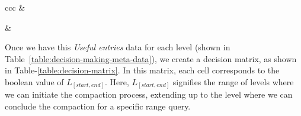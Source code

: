 \begin{table}
\begin{tabular}{ccc}
        &


        &

    \end{tabular}
    \caption{Examples highlighting scenarios where query-driven compaction is not performed, based on the decision 
    matrix. These instances provide insights into the conditions under which the system opts for the conventional 
    compaction approach.}\label{fig:not_performing_query-driven_compaction}
    \label{table:ex-not-performing-compaction}
\end{table}

Once we have this \textit{Useful entries} data for each level (shown in Table~\ref{table:decision-making-meta-data}), we create a decision matrix, as shown in Table-\ref{table:decision-matrix}. 
In this matrix, each cell corresponds to the boolean value of $L_{[start, end]}$. Here, $L_{[start, end]}$ signifies the 
range of levels where we can initiate the compaction process, extending up to the level where we can conclude the 
compaction for a specific range query. 

